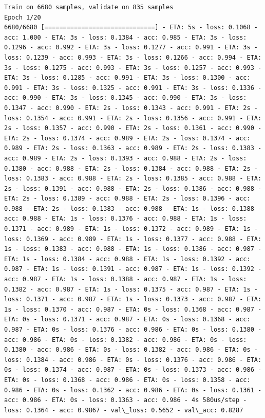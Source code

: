 \documentclass[11pt]{article}
\begin{document}
    \begin{Verbatim}[commandchars=\\\{\}]
Train on 6680 samples, validate on 835 samples
Epoch 1/20
6680/6680 [==============================] - ETA: 5s - loss: 0.1068 - acc: 1.000 - ETA: 3s - loss: 0.1384 - acc: 0.985 - ETA: 3s - loss: 0.1296 - acc: 0.992 - ETA: 3s - loss: 0.1277 - acc: 0.991 - ETA: 3s - loss: 0.1239 - acc: 0.993 - ETA: 3s - loss: 0.1266 - acc: 0.994 - ETA: 3s - loss: 0.1275 - acc: 0.993 - ETA: 3s - loss: 0.1257 - acc: 0.993 - ETA: 3s - loss: 0.1285 - acc: 0.991 - ETA: 3s - loss: 0.1300 - acc: 0.991 - ETA: 3s - loss: 0.1325 - acc: 0.991 - ETA: 3s - loss: 0.1336 - acc: 0.990 - ETA: 3s - loss: 0.1345 - acc: 0.990 - ETA: 3s - loss: 0.1347 - acc: 0.990 - ETA: 2s - loss: 0.1343 - acc: 0.991 - ETA: 2s - loss: 0.1354 - acc: 0.991 - ETA: 2s - loss: 0.1356 - acc: 0.991 - ETA: 2s - loss: 0.1357 - acc: 0.990 - ETA: 2s - loss: 0.1361 - acc: 0.990 - ETA: 2s - loss: 0.1374 - acc: 0.989 - ETA: 2s - loss: 0.1374 - acc: 0.989 - ETA: 2s - loss: 0.1363 - acc: 0.989 - ETA: 2s - loss: 0.1383 - acc: 0.989 - ETA: 2s - loss: 0.1393 - acc: 0.988 - ETA: 2s - loss: 0.1380 - acc: 0.988 - ETA: 2s - loss: 0.1384 - acc: 0.988 - ETA: 2s - loss: 0.1383 - acc: 0.988 - ETA: 2s - loss: 0.1385 - acc: 0.988 - ETA: 2s - loss: 0.1391 - acc: 0.988 - ETA: 2s - loss: 0.1386 - acc: 0.988 - ETA: 2s - loss: 0.1389 - acc: 0.988 - ETA: 2s - loss: 0.1396 - acc: 0.988 - ETA: 2s - loss: 0.1383 - acc: 0.988 - ETA: 1s - loss: 0.1388 - acc: 0.988 - ETA: 1s - loss: 0.1376 - acc: 0.988 - ETA: 1s - loss: 0.1371 - acc: 0.989 - ETA: 1s - loss: 0.1372 - acc: 0.989 - ETA: 1s - loss: 0.1369 - acc: 0.989 - ETA: 1s - loss: 0.1377 - acc: 0.988 - ETA: 1s - loss: 0.1383 - acc: 0.988 - ETA: 1s - loss: 0.1386 - acc: 0.987 - ETA: 1s - loss: 0.1384 - acc: 0.988 - ETA: 1s - loss: 0.1392 - acc: 0.987 - ETA: 1s - loss: 0.1391 - acc: 0.987 - ETA: 1s - loss: 0.1392 - acc: 0.987 - ETA: 1s - loss: 0.1388 - acc: 0.987 - ETA: 1s - loss: 0.1382 - acc: 0.987 - ETA: 1s - loss: 0.1375 - acc: 0.987 - ETA: 1s - loss: 0.1371 - acc: 0.987 - ETA: 1s - loss: 0.1373 - acc: 0.987 - ETA: 1s - loss: 0.1370 - acc: 0.987 - ETA: 0s - loss: 0.1368 - acc: 0.987 - ETA: 0s - loss: 0.1371 - acc: 0.987 - ETA: 0s - loss: 0.1368 - acc: 0.987 - ETA: 0s - loss: 0.1376 - acc: 0.986 - ETA: 0s - loss: 0.1380 - acc: 0.986 - ETA: 0s - loss: 0.1382 - acc: 0.986 - ETA: 0s - loss: 0.1380 - acc: 0.986 - ETA: 0s - loss: 0.1382 - acc: 0.986 - ETA: 0s - loss: 0.1384 - acc: 0.986 - ETA: 0s - loss: 0.1376 - acc: 0.986 - ETA: 0s - loss: 0.1374 - acc: 0.987 - ETA: 0s - loss: 0.1373 - acc: 0.986 - ETA: 0s - loss: 0.1368 - acc: 0.986 - ETA: 0s - loss: 0.1358 - acc: 0.986 - ETA: 0s - loss: 0.1362 - acc: 0.986 - ETA: 0s - loss: 0.1361 - acc: 0.986 - ETA: 0s - loss: 0.1363 - acc: 0.986 - 4s 580us/step - loss: 0.1364 - acc: 0.9867 - val\_loss: 0.5652 - val\_acc: 0.8287


\end{Verbatim}
\end{document}
